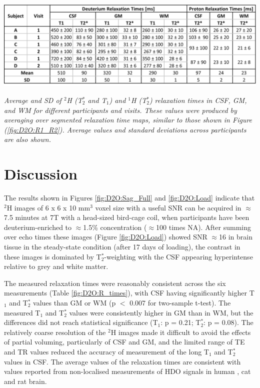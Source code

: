 \begin{table}[H]
    \centering
    \includegraphics[width=1\textwidth]{Figures/D2O/R_Times.png}
    \caption{\textit{Average and SD of $^2$H (T$_2^*$ and T$_1$) and $^1$H (T$_2^*$) relaxation times in \ac{CSF}, \ac{GM}, and \ac{WM} for different participants and visits. These values were produced by averaging over segmented relaxation time maps, similar to those shown in Figure (\ref{fig:D2O:R1_R2}). Average values and standard deviations across participants are also shown.}}
    \label{fig:D2O:R_times}
\end{table}
 
\section{Discussion}

The results shown in Figures \ref{fig:D2O:Sag_Full} and \ref{fig:D2O:Load} indicate that $^2$H images of 6 x 6 x 10 mm$^3$ voxel size with a useful \ac{SNR} can be acquired in $\approx$7.5 minutes at 7T with a head-sized bird-cage coil, when participants have been deuterium-enriched to $\approx$1.5\% concentration ($\approx$100 times \ac{NA}). After summing over echo times these images (Figure \ref{fig:D2O:Load}) showed \ac{SNR} $\approx$16 in brain tissue in the steady-state condition (after 17 days of loading), the contrast in these images is dominated by T$_2^*$-weighting with the \ac{CSF} appearing hyperintense relative to grey and white matter.

The measured relaxation times were reasonably consistent across the six measurements (Table \ref{fig:D2O:R_times}), with \ac{CSF} having significantly higher T$_1$ and T$_2^*$ values than \ac{GM} or \ac{WM} (p $<$ 0.007 for two-sample t-test). The measured T$_1$ and T$_2^*$ values were consistently higher in \ac{GM} than in \ac{WM}, but the differences did not reach statistical significance (T$_1$: p = 0.21; T$_2^*$: p = 0.08). The relatively coarse resolution of the $^2$H images made it difficult to avoid the effects of partial voluming, particularly of \ac{CSF} and \ac{GM}, and the limited range of \ac{TE} and \ac{TR} values reduced the accuracy of measurement of the long T$_1$ and T$_2^*$ values in \ac{CSF}. The average values of the relaxation times are consistent with values reported from non-localised measurements of \ac{HDO} signals in human \cite{DeFeyter2018DeuteriumVivo,DeFeyter2021DeuteriumFuture,Ruhm2021DeuteriumResolution}, cat \cite{Ewy1988DeuteriumSitu} and rat  \cite{DeFeyter2018DeuteriumVivo,Lu2017QuantitativeSpectroscopy} brain.

